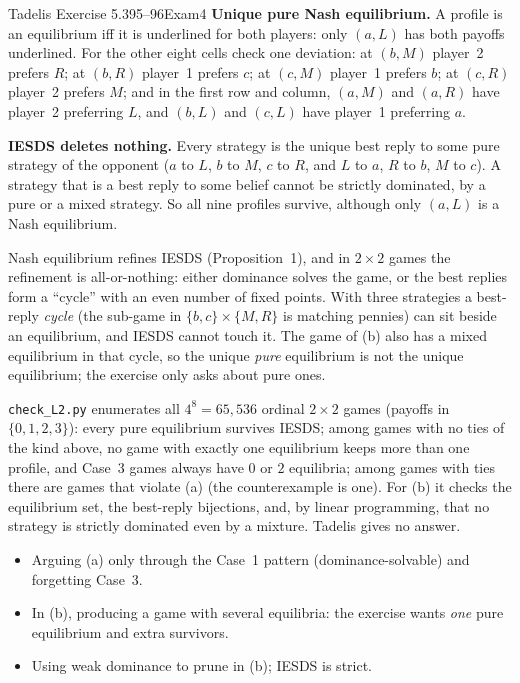 \begin{exsol}{Tadelis Exercise 5.3}{95--96}{Exam}{4}
\textbf{Unique pure Nash equilibrium.} A profile is an equilibrium iff it is underlined for both players:
only $(a, L)$ has both payoffs underlined. For the other eight cells check one deviation: at $(b,M)$
player~2 prefers $R$; at $(b,R)$ player~1 prefers $c$; at $(c,M)$ player~1 prefers $b$; at $(c,R)$
player~2 prefers $M$; and in the first row and column, $(a, M)$ and $(a,R)$ have player~2 preferring $L$,
and $(b,L)$ and $(c,L)$ have player~1 preferring $a$.

\textbf{IESDS deletes nothing.} Every strategy is the unique best reply to some pure strategy of the
opponent ($a$ to $L$, $b$ to $M$, $c$ to $R$, and $L$ to $a$, $R$ to $b$, $M$ to $c$). A strategy that is a best
reply to some belief cannot be strictly dominated, by a pure or a mixed strategy. So all nine profiles
survive, although only $(a, L)$ is a Nash equilibrium.


\interp Nash equilibrium refines IESDS (Proposition~1), and in $2\times2$ games the refinement is
all-or-nothing: either dominance solves the game, or the best replies form a ``cycle'' with an even
number of fixed points. With three strategies a best-reply \emph{cycle} (the sub-game in $\{b,c\}\times\{M,R\}$
is matching pennies) can sit beside an equilibrium, and IESDS cannot touch it. The game of (b) also
has a mixed equilibrium in that cycle, so the unique \emph{pure} equilibrium is not the unique
equilibrium; the exercise only asks about pure ones.

\verify \texttt{check\_L2.py} enumerates all $4^8 = 65{,}536$ ordinal $2\times2$ games (payoffs in
$\{0,1,2,3\}$): every pure equilibrium survives IESDS; among games with no ties of the kind above,
no game with exactly one equilibrium keeps more than one profile, and Case~3 games always have $0$ or
$2$ equilibria; among games with ties there are games that violate (a) (the counterexample is one).
For (b) it checks the equilibrium set, the best-reply bijections, and, by linear programming, that no strategy is
strictly dominated even by a mixture. Tadelis gives no answer.

\mistakes
\begin{itemize}
  \item Arguing (a) only through the Case~1 pattern (dominance-solvable) and forgetting Case~3.
  \item In (b), producing a game with several equilibria: the exercise wants \emph{one} pure
  equilibrium and extra survivors.
  \item Using weak dominance to prune in (b); IESDS is strict.
\end{itemize}
\end{exsol}
